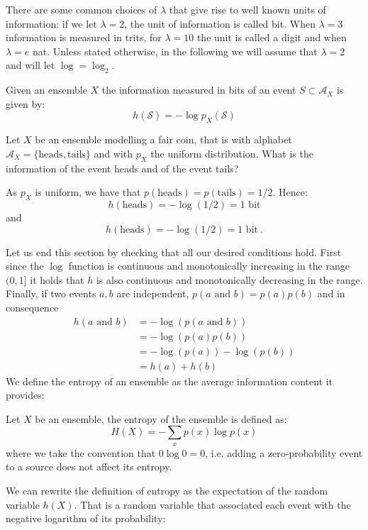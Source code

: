 There are some common choices of $\lambda$ that give rise to well known units of information: if we let $\lambda=2$, the unit of information is called bit. When $\lambda=3$ information is measured in trits, for $\lambda=10$ the unit is called a digit and when $\lambda=e$ nat. Unless stated otherwise, in the following we will assume that $\lambda=2$ and will let $\log=\log_2$.
\begin{definition}
Given an ensemble $X$ the information measured in bits of an event $S\subset \mathcal A_X$ is given by:
\begin{equation}
h(\mathcal S) = -\log p_X(\mathcal S)
\end{equation}
\end{definition}
\begin{exercise}
Let $X$ be an ensemble modelling a fair coin, that is with alphabet $\mathcal A_X=\{\text{heads},\text{tails}\}$ and with $p_X$ the uniform distribution. What is the information of the event heads and of the event tails?
\end{exercise}
\begin{solution}
As $p_X$ is uniform, we have that $p(\text{heads})=p(\text{tails})=1/2$. Hence:
\begin{equation*}
h(\text{heads})=-\log(1/2)=1\text{ bit}
\end{equation*}
and
\begin{equation*}
h(\text{heads})=-\log(1/2)=1\text{ bit}\ .
\end{equation*}
\end{solution}
Let us end this section by checking that all our desired conditions hold. First since the $\log$ function is continuous and monotonically increasing in the range $(0,1]$ it holds that $h$ is also continuous and monotonically decreasing in the range. Finally, if two events $a,b$ are independent, $p(a \text{ and } b)=p(a)p(b)$ and in consequence 
\begin{align}
h(a \text{ and } b) &= -\log \left(p(a \text{ and } b)\right)\\
                    &= -\log \left(p(a) p(b)\right)\\
                    &= -\log(p(a)) -\log(p(b))\\
                    &= h(a)+h(b)
\end{align}
\label{subsec:entropy}
We define the entropy of an ensemble as the average information content it provides:
\begin{definition} Let $X$ be an ensemble, the entropy of the ensemble is defined as: 
        \begin{equation}\label{eq:entr}
        H({X})=-\sum_{x} p(x)\log p(x)   
        \end{equation}
\noindent where we take the convention that $0\log 0=0$, i.e. adding a  zero-probability event to a source does not affect its entropy.
\end{definition}
We can rewrite the definition of entropy as the expectation of the random variable $h(X)$. That is a random variable that associated each event with the negative logarithm of its probability: 

